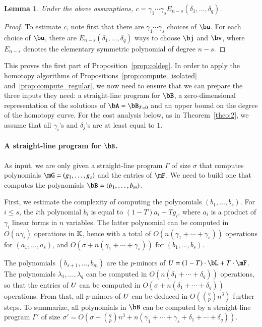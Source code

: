 \documentclass[amsthm]{elsart}
\newtheorem{lemma}[definition]{Lemma}
\begin{document}
\begin{lemma}\label{lemma:column:c_estimate}
  Under the above assumptions, $c=\gamma_1\cdots \gamma_s
  E_{n-s}(\delta_1, \ldots, \delta_q)$.
\end{lemma}
\begin{proof}
  To estimate $c$, note first that there are $\gamma_1\cdots
  \gamma_s$ choices of $\bu$. For each choice of $\bu$, there are
  $E_{n-s}(\delta_1, \ldots, \delta_q)$ ways to
  choose $\bj$ and $\bv$, where $E_{n-s}$ denotes the elementary
  symmetric polynomial of degree $n-s$.   
\end{proof}
This proves the first part of Proposition~\ref{prop:coldeg}.  In order
to apply the homotopy algorithms of Propositions~\ref{prop:compute_isolated}
and~\ref{prop:compute_regular}, we now need to ensure that we can
prepare the three inputs they need: a straight-line program for $\bB$,
a zero-dimensional representation of the solutions of $\bA=\bB_{T=0}$ and an upper
bound on the degree of the homotopy curve. For the cost analysis
below, as in Theorem~\ref{theo:2}, we assume that all $\gamma_i$'s and
$\delta_j$'s are at least equal to $1$.

\paragraph*{A straight-line program for $\bB$.} 
As input, we are only given a straight-line program $\Gamma$ of size
$\sigma$ that computes polynomials $\mG=(g_1,\dots,g_s)$ and the entries
of $\mF$. We need to build one that computes the polynomials
$\bB=(b_1,\dots,b_m)$.

First, we estimate the complexity of computing the polynomials
$(b_1,\dots,b_s)$. For $i \le s$, the $i$th polynomial $b_i$ is equal
to $(1-T)a_i + T g_i$, where $a_i$ is a product of $\gamma_i$ linear
forms in $n$ variables. The latter polynomial can be computed in $O(n
\gamma_i)$ operations in $\mathbb{K}$, hence with a total of $O(n
(\gamma_1+\cdots+\gamma_s))$ operations for $(a_1,\dots,a_s)$, and
$O(\sigma+n (\gamma_1+\cdots+\gamma_s))$ for $(b_1,\dots,b_s)$.

The polynomials $(b_{s+1},\dots,b_m)$ are the $p$-minors of
$\mU=(1-T)\cdot\bL+T\cdot\mF$.  The polynomials $\lambda_1,\dots,\lambda_q$ can
be computed in $O(n (\delta_1+\cdots+\delta_q))$ operations, so that
the entries of ${U}$ can be computed in $O(\sigma +
n(\delta_1+\cdots+\delta_q))$ operations. From that, all $p$-minors of
${U}$ can be deduced in $O({q \choose p} n^3)$ further steps.  To
summarize, all polynomials in $\bB$ can be computed by a straight-line
program $\Gamma'$ of size $\sigma'=O(\sigma + {q \choose p} n^3 +n(\gamma_1+\cdots+\gamma_s+\delta_1+\cdots+\delta_q))$.
\end{document}
